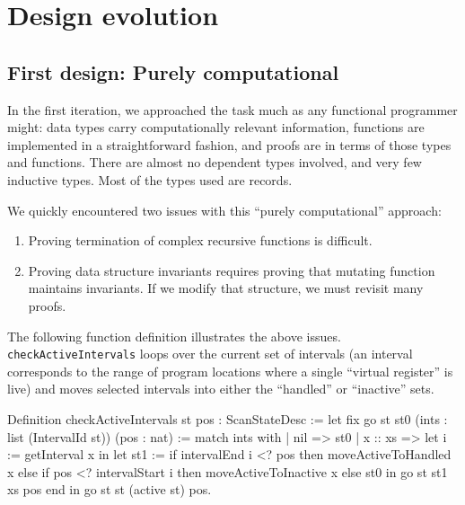 \documentclass{llncs}
\begin{document}
\section{Design evolution}
\label{sec:evolve}

\subsection{First design: Purely computational}
\label{sec:compdesign}

In the first iteration, we approached the task much as any functional
programmer might: data types carry computationally relevant
information, functions are implemented in a straightforward fashion,
and proofs are in terms of those types and functions.  There are
almost no dependent types involved, and very few inductive types.
Most of the types used are records.


We quickly encountered two issues with this ``purely computational''
approach:
\begin{enumerate}
\item Proving termination of complex recursive functions is difficult.
\item Proving data structure invariants requires proving that mutating
  function maintains invariants. If we modify that structure, we must revisit
  many proofs.
\end{enumerate}
The following function definition illustrates the above
issues. \texttt{checkActiveIntervals} loops over the current set of
intervals (an interval corresponds to the range of program locations
where a single ``virtual register'' is live) and moves selected
intervals into either the ``handled'' or ``inactive'' sets.

\begin{MyCoqExampleStar}
Definition checkActiveIntervals st pos : ScanStateDesc :=
  let fix go st st0 (ints : list (IntervalId st))
             (pos : nat) :=
    match ints with
    | nil => st0
    | x :: xs =>
        let i := getInterval x in
        let st1 := if intervalEnd i <? pos
                   then moveActiveToHandled x
                   else if pos <? intervalStart i
                        then moveActiveToInactive x
                        else st0 in
        go st st1 xs pos
    end in
  go st st (active st) pos.
\end{MyCoqExampleStar}
\end{document}
